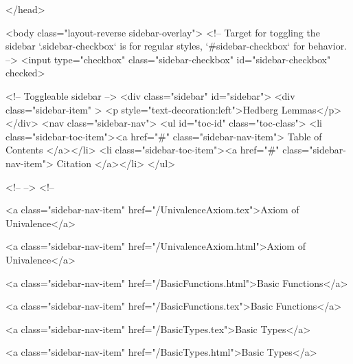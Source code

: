   
</head>




  <body class="layout-reverse sidebar-overlay">
    <!-- Target for toggling the sidebar `.sidebar-checkbox` is for regular
     styles, `#sidebar-checkbox` for behavior. -->
<input type="checkbox" class="sidebar-checkbox" id="sidebar-checkbox" checked>

<!-- Toggleable sidebar -->
<div class="sidebar" id="sidebar">
  <div class="sidebar-item" >
    <p style="text-decoration:left">Hedberg Lemmas</p>
  </div>
  <nav class="sidebar-nav">
    <ul id="toc-id" class="toc-class">
  <li class="sidebar-toc-item"><a href="#" class="sidebar-nav-item"> Table of Contents </a></li>
  <li class="sidebar-toc-item"><a href="#" class="sidebar-nav-item"> Citation </a></li>
</ul>


    <!--  -->
    <!-- 
      
    
      
    
      
    
      
    
      
        
      
    
      
        
          <a class="sidebar-nav-item" href="/UnivalenceAxiom.tex">Axiom of Univalence</a>
        
      
    
      
        
          <a class="sidebar-nav-item" href="/UnivalenceAxiom.html">Axiom of Univalence</a>
        
      
    
      
        
          <a class="sidebar-nav-item" href="/BasicFunctions.html">Basic Functions</a>
        
      
    
      
        
          <a class="sidebar-nav-item" href="/BasicFunctions.tex">Basic Functions</a>
        
      
    
      
        
          <a class="sidebar-nav-item" href="/BasicTypes.tex">Basic Types</a>
        
      
    
      
        
          <a class="sidebar-nav-item" href="/BasicTypes.html">Basic Types</a>
        
      
    
